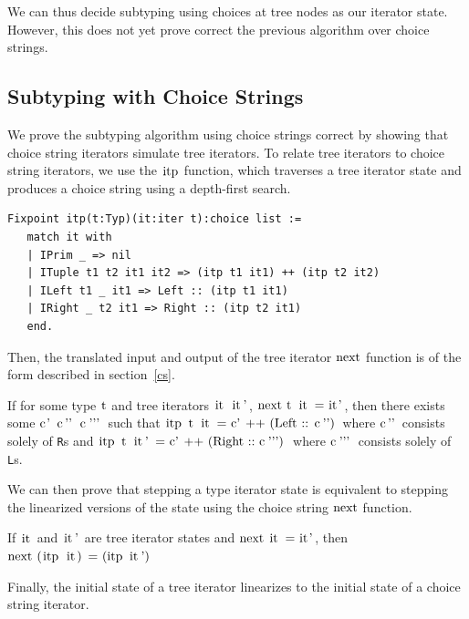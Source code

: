 \documentclass[a4paper,english]{lipics-v2019}
\newcommand{\Ls}{{\tt L}s\xspace}
\newcommand{\Rs}{{\tt R}s\xspace}
\renewcommand{\c}[1]{\ensuremath{\text{\lstinline{#1}}}\xspace}
\begin{document}
We can thus decide subtyping using choices at tree nodes as our iterator state.
However, this does not yet prove correct the previous algorithm over choice strings.

\subsection{Subtyping with Choice Strings}

We prove the subtyping algorithm using choice strings correct by 
showing that choice string iterators simulate tree iterators. To 
relate tree iterators to choice string iterators, we use the \c{itp} 
function, which traverses a tree iterator state and produces a choice
string using a depth-first search.

\begin{small}\begin{verbatim}
Fixpoint itp(t:Typ)(it:iter t):choice list :=
   match it with
   | IPrim _ => nil
   | ITuple t1 t2 it1 it2 => (itp t1 it1) ++ (itp t2 it2)
   | ILeft t1 _ it1 => Left :: (itp t1 it1)
   | IRight _ t2 it1 => Right :: (itp t2 it1)
   end.
\end{verbatim}\end{small}

Then, the translated input and output of the tree iterator \c{next}
function is of the form described in section~\ref{cs}. 

\begin{lemma}
\label{lem:snt}
If for some type \c{t} and tree iterators \c{it it'}, \c{next t it = it'},
then there exists some \c{c' c'' c'''} such that \c{itp t it = c' ++ (Left :: c'')} 
where \c{c''} consists solely of \Rs and \c{itp t it' = c' ++ (Right :: c''')} where
\c{c'''} consists solely of \Ls.
\end{lemma}

We can then prove that stepping a type iterator state is equivalent to
stepping the linearized versions of the state using the choice string
\c{next} function.

\begin{lemma}\label{sctxcorr}
If \c{it} and \c{it'} are tree iterator states and 
\c{next it = it'}, then \c{next (itp it) = (itp it')}
\end{lemma}

Finally, the initial state of a tree iterator linearizes to the
initial state of a choice string iterator.
\end{document}

